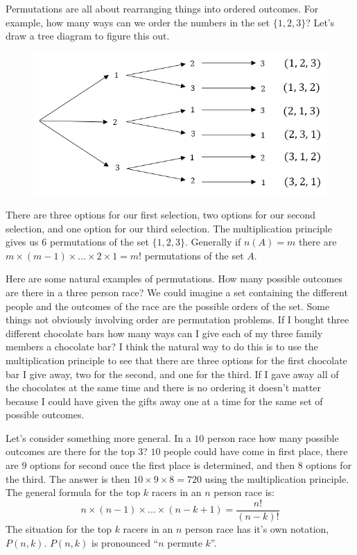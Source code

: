 \documentclass[]{book}
\begin{document}
Permutations are all about rearranging things into ordered outcomes. For
example, how many ways can we order the numbers in the set
\(\{1,2,3\}\)? Let's draw a tree diagram to figure this out.

\begin{figure}
\centering
\includegraphics{Pictures/02-Counting/permute3large.PNG}
\caption{}
\end{figure}

There are three options for our first selection, two options for our
second selection, and one option for our third selection. The
multiplication principle gives us 6 permutations of the set
\(\{1,2,3\}\). Generally if \(n(A) = m\) there are
\(m \times (m-1) \times ... \times 2 \times 1 = m!\) permutations of the
set \(A\).

Here are some natural examples of permutations. How many possible
outcomes are there in a three person race? We could imagine a set
containing the different people and the outcomes of the race are the
possible orders of the set. Some things not obviously involving order
are permutation problems. If I bought three different chocolate bars how
many ways can I give each of my three family members a chocolate bar? I
think the natural way to do this is to use the multiplication principle
to see that there are three options for the first chocolate bar I give
away, two for the second, and one for the third. If I gave away all of
the chocolates at the same time and there is no ordering it doesn't
matter because I could have given the gifts away one at a time for the
same set of possible outcomes.

Let's consider something more general. In a \(10\) person race how many
possible outcomes are there for the top \(3\)? \(10\) people could have
come in first place, there are \(9\) options for second once the first
place is determined, and then \(8\) options for the third. The answer is
then \(10 \times 9 \times 8=720\) using the multiplication principle.
The general formula for the top \(k\) racers in an \(n\) person race is:
\[n \times (n-1) \times ... \times (n-k+1) = \frac{n!}{(n-k)!}\] The
situation for the top \(k\) racers in an \(n\) person race has it's own
notation, \(P(n,k)\). \(P(n,k)\) is pronounced ``\(n\) permute \(k\)''.
\end{document}

